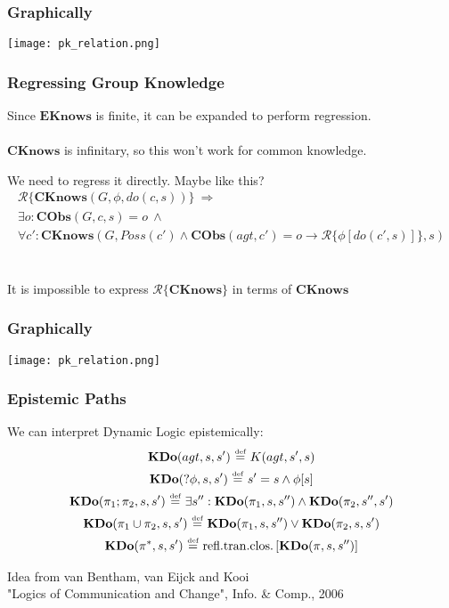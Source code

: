 \documentclass{beamer}
\newcommand{\isdef}{\hbox{$\stackrel{\mbox{\tiny def}}{=}$}}
\begin{document}
\begin{frame}
\frametitle{Graphically}
\begin{center}
  \texttt{[image: pk\_relation.png]}
\end{center}
\end{frame}

\begin{frame}
\frametitle{Regressing Group Knowledge}
Since $\mathbf{EKnows}$ is finite, it can be expanded to perform regression.
\ \\
\ \\
$\mathbf{CKnows}$ is infinitary, so this won't work for common knowledge.

We need to regress it directly.  Maybe like this?
\begin{multline*}
\mathcal{R}\{\mathbf{CKnows}(G,\phi,do(c,s))\}\ \Rightarrow \\
\exists o: \mathbf{CObs}(G,c,s)=o\ \wedge\\
\forall c': \mathbf{CKnows}(G,Poss(c') \wedge \mathbf{CObs}(agt,c')=o \rightarrow \mathcal{R}\{\phi[do(c',s)]\},s)
\end{multline*}
\ \\
\ \\
\pause
It is \alert{impossible} to express $\mathcal{R}\{\mathbf{CKnows}\}$ in terms of $\mathbf{CKnows}$
\end{frame}

\begin{frame}
\frametitle{Graphically}
\begin{center}
  \texttt{[image: pk\_relation.png]}
\end{center}
\end{frame}

\begin{frame}
\frametitle{Epistemic Paths}
We can interpret Dynamic Logic epistemically:
\begin{gather*}
\mathbf{KDo}(agt,s,s')\ \isdef\ K(agt,s',s)\\
\mathbf{KDo}(?\phi,s,s')\ \isdef\ s'=s \wedge \phi[s]\\
\mathbf{KDo}(\pi_1;\pi_2,s,s')\ \isdef\ \exists s'': \mathbf{KDo}(\pi_1,s,s'') \wedge \mathbf{KDo}(\pi_2,s'',s')\\
\mathbf{KDo}(\pi_1\cup\pi_2,s,s')\ \isdef\ \mathbf{KDo}(\pi_1,s,s'') \vee \mathbf{KDo}(\pi_2,s,s')\\
\mathbf{KDo}(\pi^*,s,s')\ \isdef\ \mathrm{refl. tran. clos.}\left[\mathbf{KDo}(\pi,s,s'')\right]\\
\end{gather*}

Idea from van Bentham, van Eijck and Kooi\\
"Logics of Communication and Change", Info. \& Comp., 2006
\end{frame}
\end{document}
